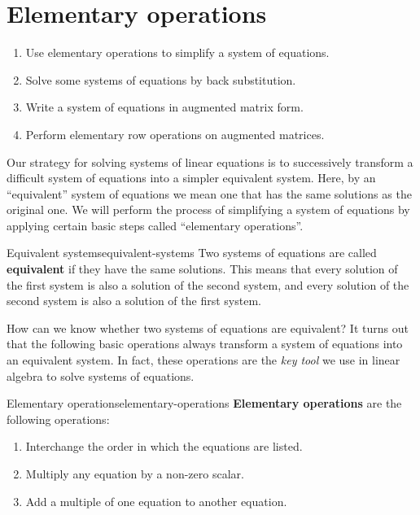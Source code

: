 \section{Elementary operations}

\begin{outcome}
  \begin{enumerate}
  \item Use elementary operations to simplify a system of equations.
  \item Solve some systems of equations by back substitution.
  \item Write a system of equations in augmented matrix form.
  \item Perform elementary row operations on augmented matrices.
  \end{enumerate}
\end{outcome}

Our strategy for solving systems of linear equations is to
successively transform a difficult system of equations into a simpler
equivalent system. Here, by an ``equivalent'' system of equations we
mean one that has the same solutions as the original one. We will
perform the process of simplifying a system of equations by applying
certain basic steps called ``elementary operations''.

\begin{definition}{Equivalent systems}{equivalent-systems}
  Two systems of equations are called
  \textbf{equivalent}
  if they have the same solutions. This means that every solution of
  the first system is also a solution of the second system, and every
  solution of the second system is also a solution of the first system.
\end{definition}

How can we know whether two systems of equations are equivalent? It
turns out that the following basic operations always transform a
system of equations into an equivalent system. In fact, these
operations are the {\em key tool} we use in linear algebra to solve
systems of equations.

\begin{definition}{Elementary operations}{elementary-operations}
  \textbf{Elementary operations} are the
  following operations:

  \begin{enumerate}
  \item Interchange the order in which the equations are listed.

  \item Multiply any equation by a non-zero scalar.

  \item Add a multiple of one equation to another equation.
  \end{enumerate}
\end{definition}

